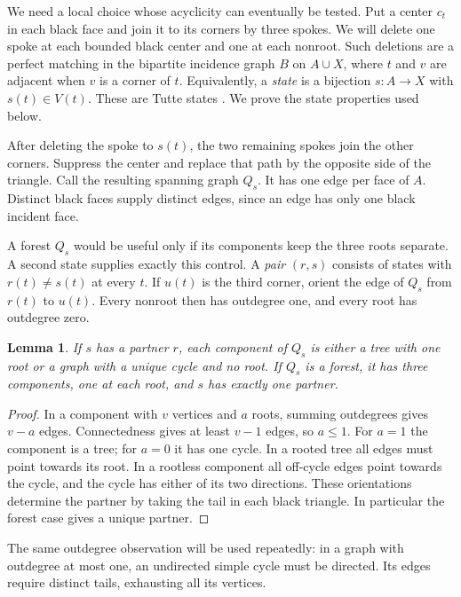 \documentclass[10pt,a4paper]{amsart}
\newtheorem{lemma}[theorem]{Lemma}
\theoremstyle{remark}
\begin{document}
We need a local choice whose acyclicity can eventually be tested. Put a center $c_t$ in each black face and join it to its corners by three spokes. We will delete one spoke at each bounded black center and one at each nonroot. Such deletions are a perfect matching in the bipartite incidence graph $B$ on $A\cup X$, where $t$ and $v$ are adjacent when $v$ is a corner of $t$. Equivalently, a \emph{state} is a bijection $s:A\to X$ with $s(t)\in V(t)$. These are Tutte states \cite{tutte1975,hine-kalman2018}. We prove the state properties used below.

After deleting the spoke to $s(t)$, the two remaining spokes join the other corners. Suppress the center and replace that path by the opposite side of the triangle. Call the resulting spanning graph $Q_s$. It has one edge per face of $A$. Distinct black faces supply distinct edges, since an edge has only one black incident face.

A forest $Q_s$ would be useful only if its components keep the three roots separate. A second state supplies exactly this control. A \emph{pair} $(r,s)$ consists of states with $r(t)\ne s(t)$ at every $t$. If $u(t)$ is the third corner, orient the edge of $Q_s$ from $r(t)$ to $u(t)$. Every nonroot then has outdegree one, and every root has outdegree zero.
\begin{lemma}\label{lem:components}
If $s$ has a partner $r$, each component of $Q_s$ is either a tree with one root or a graph with a unique cycle and no root. If $Q_s$ is a forest, it has three components, one at each root, and $s$ has exactly one partner.
\end{lemma}
\begin{proof}
In a component with $v$ vertices and $a$ roots, summing outdegrees gives $v-a$ edges. Connectedness gives at least $v-1$ edges, so $a\leq1$. For $a=1$ the component is a tree; for $a=0$ it has one cycle. In a rooted tree all edges must point towards its root. In a rootless component all off-cycle edges point towards the cycle, and the cycle has either of its two directions. These orientations determine the partner by taking the tail in each black triangle. In particular the forest case gives a unique partner.
\end{proof}
The same outdegree observation will be used repeatedly: in a graph with outdegree at most one, an undirected simple cycle must be directed. Its edges require distinct tails, exhausting all its vertices.
\end{document}
